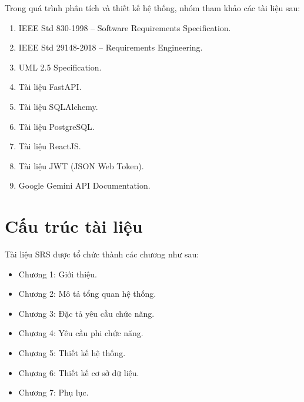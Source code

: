 Trong quá trình phân tích và thiết kế hệ thống, nhóm tham khảo các tài liệu sau:

\begin{enumerate}

\item IEEE Std 830-1998 -- Software Requirements Specification.

\item IEEE Std 29148-2018 -- Requirements Engineering.

\item UML 2.5 Specification.

\item Tài liệu FastAPI.

\item Tài liệu SQLAlchemy.

\item Tài liệu PostgreSQL.

\item Tài liệu ReactJS.

\item Tài liệu JWT (JSON Web Token).

\item Google Gemini API Documentation.

\end{enumerate}


\section{Cấu trúc tài liệu}

Tài liệu SRS được tổ chức thành các chương như sau:

\begin{itemize}

\item Chương 1: Giới thiệu.

\item Chương 2: Mô tả tổng quan hệ thống.

\item Chương 3: Đặc tả yêu cầu chức năng.

\item Chương 4: Yêu cầu phi chức năng.

\item Chương 5: Thiết kế hệ thống.

\item Chương 6: Thiết kế cơ sở dữ liệu.

\item Chương 7: Phụ lục.

\end{itemize}